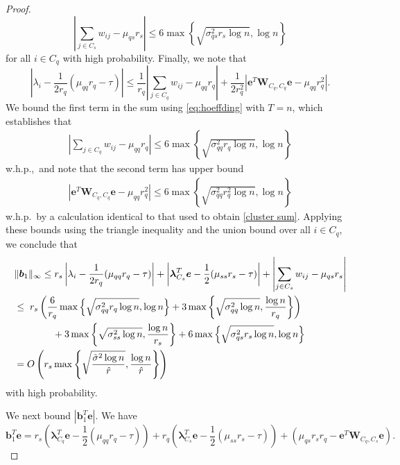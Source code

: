 \documentclass[twoside,11pt]{article}
\newcommand{\bs}{\boldsymbol}
\newcommand{\0}{\bs{0}}
\newcommand{\abs}[1]{\ensuremath{\left| #1  \right| }}
\newcommand{\rbra}[1]{\ensuremath{\left( #1 \right)}} %
\newcommand{\bra}[1]{\ensuremath{\left\{ #1 \right\}}} %
\begin{document}
\begin{proof}
\begin{equation}
	\abs{ \sum_{j\in C_s} w_{ij} - \mu_{qs} r_s }
		\le 6 \max \bra{ \sqrt{\sigma^2_{qs} r_s \log n}, \log n }
\end{equation}
for all $i \in C_q$ with high probability.
Finally, we note that
\begin{equation}
\label{eq:temp3}
\left|\lambda_i - \frac{1}{2r_q}(\mu_{qq} r_q - \tau)\right| \leq \frac{1}{r_q}\left|\sum_{j \in C_q} w_{ij} - \mu_{qq} r_q \right| + \frac{1}{2r_q^2}\left|\bs{e}^T \bs{W}_{C_q,C_q} \bs{e} - \mu_{qq} r_q^2\right|.
\end{equation}
We bound the first term in the sum using \eqref{eq:hoeffding} with $T=n$,
which establishes that
\begin{align*}
 \left|\sum_{j \in C_q} w_{ij}- \mu_{qq} r_q\right|
 	\le 6 \max \bra{ \sqrt{\sigma^2_{qq} r_q \log n}, \log n }
\end{align*}
w.h.p.,~and note that the second term has upper bound
\begin{align*}
 \left| \bs{e}^T \bs{W}_{C_q,C_q} \bs{e} - \mu_{qq} r_q^2 \right|
\le 6 \max \bra{\sqrt{\sigma_{qq}^2 r_q^2 \log n}, \log n }
\end{align*}
w.h.p.~by a calculation identical to that used to obtain \eqref{cluster sum}.
Applying these bounds using the triangle inequality and the
union bound over all $i \in C_q$, we conclude that
\begin{align}
&\|\bs{b}_1\|_{\infty} \leq r_s \left|\lambda_i -\frac{1}{2r_q}(\mu_{qq} r_q - \tau)\right|
+ \left|\bs{\lambda}_{C_s}^T\bs{e} - \frac{1}{2}(\mu_{ss} r_s - \tau)\right| + \left|\sum_{j \in C_s} w_{ij} - \mu_{qs} r_s\right| \notag\\
 & \leq  \;r_s \left(\frac{6}{r_q}\max \bra{ \sqrt{\sigma^2_{qq} r_q \log n}, \log n } + 3 \max\bra{ \sqrt{\sigma_{qq}^2  \log n}, \frac{\log n}{r_q}} \right) \notag \\
& \hspace{0.55in} + 3  \max\bra{ \sqrt{\sigma_{ss}^2  \log n}, \frac{\log n}{r_s}}
+ 6 \max\bra{ \sqrt{\sigma_{qs}^2  r_s \log n}, \log n}  \notag\\
 & =  O \rbra{ r_s \max \bra{  \sqrt{ \frac{ \tilde{\sigma}^2 \log n}{\hat{r}} }, \frac{ \log n}{\hat{r}} } } \label{eq:b1_inf_orig}
\end{align}
with high probability.

We next bound $\left|\bs{b}_1^T \bs{e}\right|$. We have
$$ \bs{b}_1^T \bs{e} = r_s \left(\bs{\lambda}_{C_q}^T \bs{e} - \frac{1}{2}\left(\mu_{qq} r_q - \tau\right)\right) + r_q \left(\bs{\lambda}_{C_s}^T \bs{e} - \frac{1}{2}\left(\mu_{ss} r_s - \tau\right)\right) + \left(\mu_{qs} r_s r_q - \bs{e}^T \bs{W}_{C_q,C_s}\bs{e}\right).$$



\end{proof}
\end{document}
